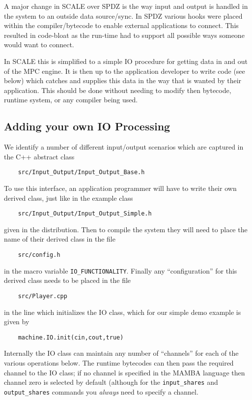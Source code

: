 \label{sec:IO}

A major change in SCALE over SPDZ is the way input and output
is handled in the system to an outside data source/sync.
In SPDZ various hooks were placed within the compiler/bytecode
to enable external applications to connect. This resulted in
code-bloat as the run-time had to support all possible
ways someone would want to connect.

In SCALE this is simplified to a simple IO procedure for
getting data in and out of the MPC engine. It is then up
to the application developer to write code (see below)
which catches and supplies this data in the way that is
wanted by their application.
This should be done without needing to modify then bytecode,
runtime system, or any compiler being used.

\subsection{Adding your own IO Processing}
We identify a number of different input/output scenarios
which are captured in the C++ abstract class 
\begin{verbatim}
    src/Input_Output/Input_Output_Base.h
\end{verbatim}
To use this interface, an application programmer will have to
write their own derived class, just like in the example
class
\begin{verbatim}
    src/Input_Output/Input_Output_Simple.h
\end{verbatim}
given in the distribution.
Then to compile the system they will need to place the
name of their derived class in the file
\begin{verbatim}
    src/config.h
\end{verbatim}
in the macro variable \verb+IO_FUNCTIONALITY+.
Finally any ``configuration'' for this derived class needs
to be placed in the file
\begin{verbatim}
    src/Player.cpp
\end{verbatim}
in the line which initializes the IO class, which for
our simple demo example is given by
\begin{verbatim}
    machine.IO.init(cin,cout,true)
\end{verbatim}
Internally the IO class can maintain any number of ``channels''
for each of the various operations below.
The runtime bytecodes can then pass the required channel to the 
IO class; if no channel is specified in the MAMBA language
then channel zero is selected by default (although for
the \verb+input_shares+ and \verb+output_shares+ commands
you {\em always} need to specify a channel.

